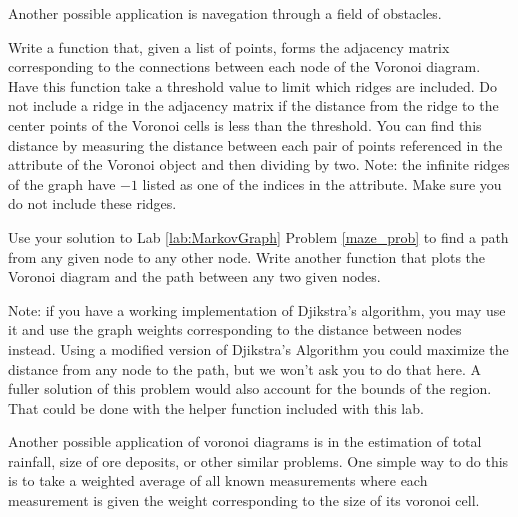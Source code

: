 Another possible application is navegation through a field of obstacles.

\begin{problem}
Write a function that, given a list of points, forms the adjacency matrix corresponding to the connections between each node of the Voronoi diagram.
Have this function take a threshold value to limit which ridges are included.
Do not include a ridge in the adjacency matrix if the distance from the ridge to the center points of the Voronoi cells is less than the threshold.
You can find this distance by measuring the distance between each pair of points referenced in the  attribute of the Voronoi object and then dividing by two.
Note: the infinite ridges of the graph have $-1$ listed as one of the indices in the  attribute.
Make sure you do not include these ridges.

Use your solution to Lab \ref{lab:MarkovGraph} Problem \ref{maze_prob} to find a path from any given node to any other node.
Write another function that plots the Voronoi diagram and the path between any two given nodes.

Note: if you have a working implementation of Djikstra's algorithm, you may use it and use the graph weights corresponding to the distance between nodes instead.
Using a modified version of Djikstra's Algorithm you could maximize the distance from any node to the path, but we won't ask you to do that here.
A fuller solution of this problem would also account for the bounds of the region.
That could be done with the helper function included with this lab.
\end{problem}

Another possible application of voronoi diagrams is in the estimation of total rainfall, size of ore deposits, or other similar problems.
One simple way to do this is to take a weighted average of all known measurements where each measurement is given the weight corresponding to the size of its voronoi cell.

